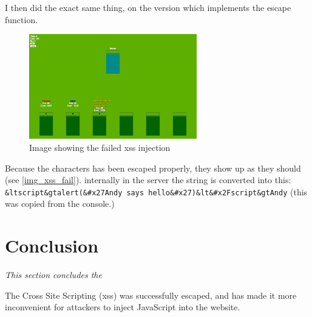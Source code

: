 \documentclass[a4paper]{article}
\begin{document}
I then did the exact same thing, on the version which implements the escape function.

\begin{figure}[H]
  \centering
  \includegraphics[width=0.65\textwidth]{images/xss_prevented}
  \caption{Image showing the failed xss injection}
  \label{img_xss_fail}
\end{figure}

Because the characters has been escaped properly, they show up as they should (see \autoref{img_xss_fail}). internally in the server the string is converted into this: \\\texttt{\&ltscript\&gtalert(\&\#x27Andy says hello\&\#x27)\&lt\&\#x2Fscript\&gtAndy} (this was copied from the console.)




\section{Conclusion}
\textit{This section concludes the }

The Cross Site Scripting (xss) was successfully escaped, and has made it more inconvenient for attackers to inject JavaScript into the website.

\label{page_b4_appendices}




\clearpage
\rfoot{ }



\listoffigures
\listoflistings


\end{document}
